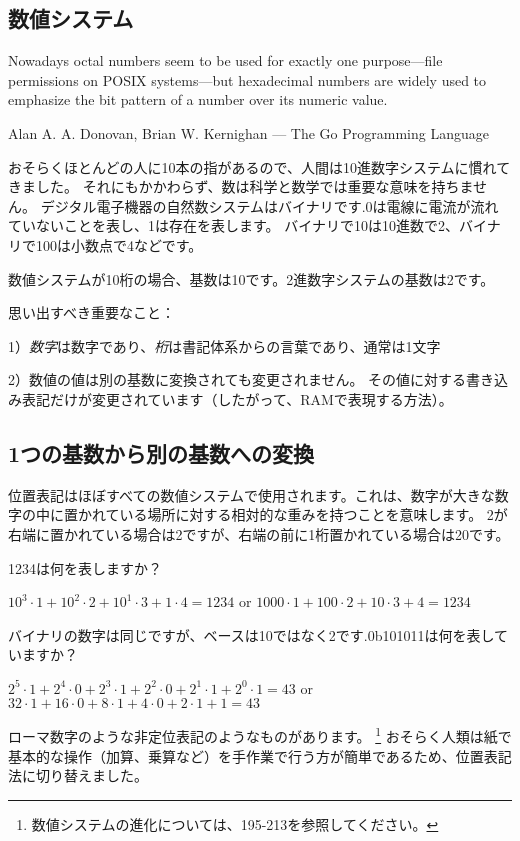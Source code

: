 \subsection{数値システム}

\epigraph{Nowadays octal numbers seem to be
used for exactly one purpose---file permissions on POSIX systems---but hexadecimal numbers
are widely used to emphasize the bit pattern of a number over its numeric value.}
{Alan A. A. Donovan, Brian W. Kernighan ---  The Go Programming Language}

おそらくほとんどの人に10本の指があるので、人間は10進数字システムに慣れてきました。 それにもかかわらず、数は科学と数学では重要な意味を持ちません。 デジタル電子機器の自然数システムはバイナリです.0は電線に電流が流れていないことを表し、1は存在を表します。 バイナリで10は10進数で2、バイナリで100は小数点で4などです。

数値システムが10桁の場合、基数は10です。2進数字システムの基数は2です。

思い出すべき重要なこと：

1）\emph{数字}は数字であり、\emph{桁}は書記体系からの言葉であり、通常は1文字

2）数値の値は別の基数に変換されても変更されません。 その値に対する書き込み表記だけが変更されています（したがって、\ac{RAM}で表現する方法）。

\subsection{1つの基数から別の基数への変換}

位置表記はほぼすべての数値システムで使用されます。これは、数字が大きな数字の中に置かれている場所に対する相対的な重みを持つことを意味します。
2が右端に置かれている場合は2ですが、右端の前に1桁置かれている場合は20です。

1234は何を表しますか？

$10^3 \cdot 1 + 10^2 \cdot 2 + 10^1 \cdot 3 + 1 \cdot 4 = 1234$ or
$1000 \cdot 1 + 100 \cdot 2 + 10 \cdot 3 + 4 = 1234$

バイナリの数字は同じですが、ベースは10ではなく2です.0b101011は何を表していますか？

$2^5 \cdot 1 + 2^4 \cdot 0 + 2^3 \cdot 1 + 2^2 \cdot 0 + 2^1 \cdot 1 + 2^0 \cdot 1 = 43$ or
$32 \cdot 1 + 16 \cdot 0 + 8 \cdot 1 + 4 \cdot 0 + 2 \cdot 1 + 1 = 43$

ローマ数字のような非定位表記のようなものがあります。
\footnote{数値システムの進化については、195-213を参照してください。}
おそらく人類は紙で基本的な操作（加算、乗算など）を手作業で行う方が簡単であるため、位置表記法に切り替えました。

